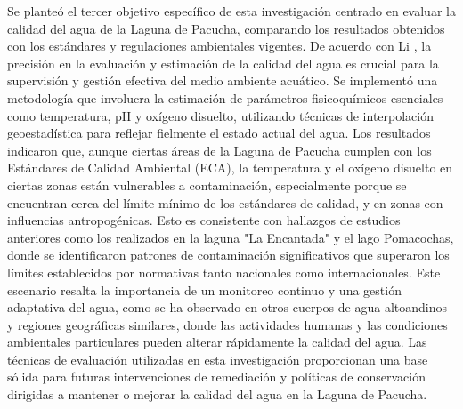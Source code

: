 Se planteó el tercer objetivo específico de esta investigación centrado en evaluar la calidad del agua de la Laguna de Pacucha, comparando los resultados obtenidos con los estándares y regulaciones ambientales vigentes. De acuerdo con Li \cite{Li2019}, la precisión en la evaluación y estimación de la calidad del agua es crucial para la supervisión y gestión efectiva del medio ambiente acuático. Se implementó una metodología que involucra la estimación de parámetros fisicoquímicos esenciales como temperatura, pH y oxígeno disuelto, utilizando técnicas de interpolación geoestadística para reflejar fielmente el estado actual del agua. Los resultados indicaron que, aunque ciertas áreas de la Laguna de Pacucha cumplen con los Estándares de Calidad Ambiental (ECA), la temperatura y el oxígeno disuelto en ciertas zonas están vulnerables a contaminación, especialmente porque se encuentran cerca del límite mínimo de los estándares de calidad, y en zonas con influencias antropogénicas. Esto es consistente con hallazgos de estudios anteriores como los realizados en la laguna "La Encantada" \cite{GutierrezNazario2023} y el lago Pomacochas, donde se identificaron patrones de contaminación significativos que superaron los límites establecidos por normativas tanto nacionales como internacionales. Este escenario resalta la importancia de un monitoreo continuo y una gestión adaptativa del agua, como se ha observado en otros cuerpos de agua altoandinos y regiones geográficas similares, donde las actividades humanas y las condiciones ambientales particulares pueden alterar rápidamente la calidad del agua. Las técnicas de evaluación utilizadas en esta investigación proporcionan una base sólida para futuras intervenciones de remediación y políticas de conservación dirigidas a mantener o mejorar la calidad del agua en la Laguna de Pacucha.
